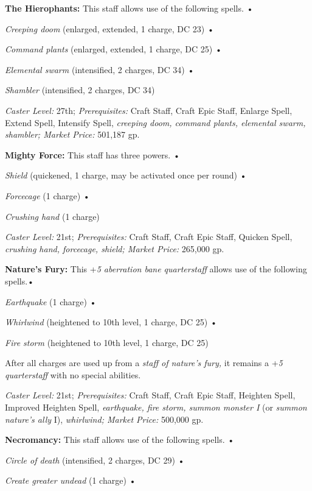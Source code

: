 \documentclass{article}
\begin{document}
\textbf{The Hierophants: }This staff allows use of the following spells. • 

\parindent=3pt
\textit{Creeping doom }(enlarged, extended, 1 charge, DC 23) • 

\textit{Command plants }(enlarged, extended, 1 charge, DC 25) • 

\textit{Elemental swarm }(intensified, 2 charges, DC 34) • 

\textit{Shambler }(intensified, 2 charges, DC 34) 

\parindent=0pt
\textit{Caster Level: }27th; \textit{Prerequisites: }Craft Staff, Craft Epic Staff, 
Enlarge Spell, Extend Spell, Intensify Spell, \textit{creeping doom, command plants, 
elemental swarm, shambler; Market Price: }501,187 gp. 

\textbf{Mighty Force: }This staff has three powers. • 

\textit{Shield }(quickened, 1 charge, may be activated once per round) • 

\textit{Forcecage }(1 charge) • 

\textit{Crushing hand }(1 charge) 

\textit{Caster Level: }21st; \textit{Prerequisites: }Craft Staff, Craft Epic Staff, 
Quicken Spell, \textit{crushing hand, forcecage, shield; Market Price: }265,000 
gp. 

\textbf{Nature's Fury: }This +\textit{5 aberration bane quarterstaff} allows use 
of the following spells.• 

\textit{Earthquake }(1 charge) • 

\textit{Whirlwind }(heightened to 10th level, 1 charge, DC 25) • 

\textit{Fire storm }(heightened to 10th level, 1 charge, DC 25) 

After all charges are used up from a \textit{staff of nature's fury, }it remains 
a +\textit{5 quarterstaff }with no special abilities. 

\textit{Caster Level: }21st; \textit{Prerequisites: }Craft Staff, Craft Epic Staff, 
Heighten Spell, Improved Heighten Spell, \textit{earthquake, fire storm, summon 
monster I }(or \textit{summon nature's ally }I), \textit{whirlwind; Market Price: 
}500,000 gp. 

\textbf{Necromancy: }This staff allows use of the following spells. • 

\parindent=3pt
\textit{Circle of death }(intensified, 2 charges, DC 29) • 

\textit{Create greater undead }(1 charge) • 
\end{document}
